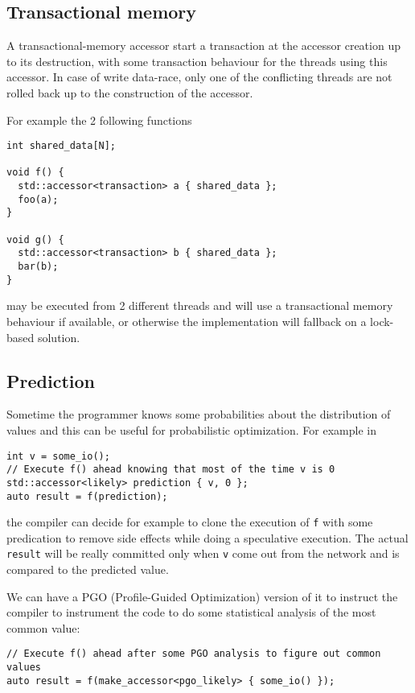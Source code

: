 \documentclass[a4paper]{article}
\begin{document}
\subsection{Transactional memory}
\label{sec:transactional-memory}

A transactional-memory accessor start a transaction at the accessor
creation up to its destruction, with some transaction behaviour for
the threads using this accessor. In case of write data-race, only one
of the conflicting threads are not rolled back up to the construction
of the accessor.

For example the 2 following functions
\begin{lstlisting}
int shared_data[N];

void f() {
  std::accessor<transaction> a { shared_data };
  foo(a);
}

void g() {
  std::accessor<transaction> b { shared_data };
  bar(b);
}
\end{lstlisting}
may be executed from 2 different threads and will use a transactional
memory behaviour if available, or otherwise the implementation will
fallback on a lock-based solution.


\subsection{Prediction}
\label{sec:prediction}

Sometime the programmer knows some probabilities about the
distribution of values and this can be useful for probabilistic
optimization. For example in
\begin{lstlisting}
int v = some_io();
// Execute f() ahead knowing that most of the time v is 0
std::accessor<likely> prediction { v, 0 };
auto result = f(prediction);
\end{lstlisting}
the compiler can decide for example to clone the execution of
\texttt{f} with some predication to remove side effects while doing a
speculative execution. The actual \texttt{result} will be really
committed only when \texttt{v} come out from the network and is
compared to the predicted value.


We can have a PGO (Profile-Guided Optimization) version of it to
instruct the compiler to instrument the code to do some statistical
analysis of the most common value:
\begin{lstlisting}
// Execute f() ahead after some PGO analysis to figure out common values
auto result = f(make_accessor<pgo_likely> { some_io() });
\end{lstlisting}
\end{document}
